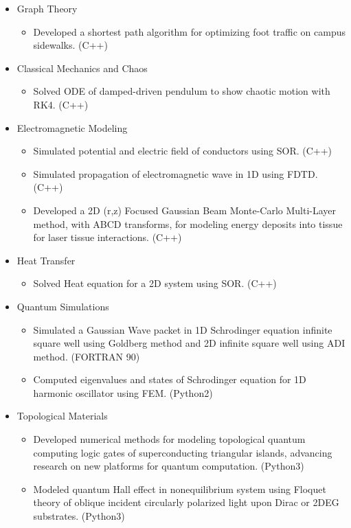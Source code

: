 \documentclass[10pt, letterpaper]{article}
\newenvironment{highlights}{
    \begin{itemize}[
        topsep=0.10 cm,
        parsep=0.10 cm,
        partopsep=0pt,
        itemsep=0pt,
        leftmargin=0 cm + 10pt
    ]
}{
    \end{itemize}
} %
\begin{document}
        \begin{onecolumnentry}
          \begin{highlights}
          \item Graph Theory
            \begin{highlights}
              \item Developed a shortest path algorithm for optimizing foot traffic on campus sidewalks. (C++)
            \end{highlights}
          \item Classical Mechanics and Chaos
            \begin{highlights}
              \item Solved ODE of damped-driven pendulum to show chaotic motion with RK4. (C++)
            \end{highlights}
          \item Electromagnetic Modeling
            \begin{highlights}
            \item Simulated potential and electric field of conductors using SOR. (C++)
              \item Simulated propagation of electromagnetic wave in 1D using FDTD. (C++)
              \item Developed a 2D (r,z) Focused Gaussian Beam Monte-Carlo Multi-Layer method, with ABCD transforms, for modeling energy deposits into tissue for laser tissue interactions. (C++)
            \end{highlights}
          \item Heat Transfer
            \begin{highlights}
              \item Solved Heat equation for a 2D system using SOR. (C++)
            \end{highlights}
          \item Quantum Simulations
            \begin{highlights}
              \item Simulated a Gaussian Wave packet in 1D Schrodinger equation infinite square well using Goldberg method and 2D infinite square well using ADI method. (FORTRAN 90)
              \item Computed eigenvalues and states of Schrodinger equation for 1D harmonic oscillator using FEM. (Python2)
            \end{highlights}
          \item Topological Materials
            \begin{highlights}
              \item Developed numerical methods for modeling topological quantum computing logic gates of superconducting triangular islands, advancing research on new platforms for quantum computation. (Python3)
              \item Modeled quantum Hall effect in nonequilibrium system using Floquet theory of oblique incident circularly polarized light upon Dirac or 2DEG substrates. (Python3)
            \end{highlights}
          \end{highlights}
        \end{onecolumnentry}
\end{document}
